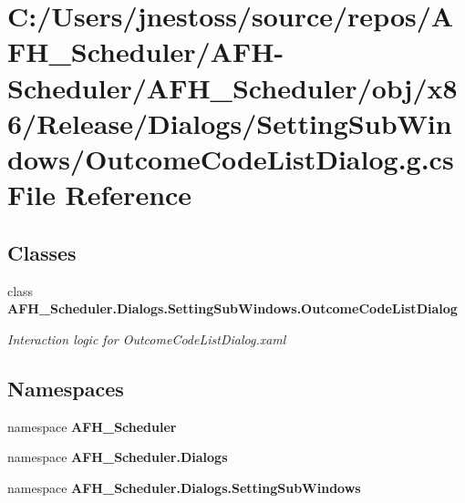 \section{C\+:/\+Users/jnestoss/source/repos/\+A\+F\+H\+\_\+\+Scheduler/\+A\+F\+H-\/\+Scheduler/\+A\+F\+H\+\_\+\+Scheduler/obj/x86/\+Release/\+Dialogs/\+Setting\+Sub\+Windows/\+Outcome\+Code\+List\+Dialog.g.\+cs File Reference}
\label{x86_2_release_2_dialogs_2_setting_sub_windows_2_outcome_code_list_dialog_8g_8cs}
\subsection*{Classes}
\begin{DoxyCompactItemize}
\item 
class \textbf{ A\+F\+H\+\_\+\+Scheduler.\+Dialogs.\+Setting\+Sub\+Windows.\+Outcome\+Code\+List\+Dialog}
\begin{DoxyCompactList}\small\item\em Interaction logic for Outcome\+Code\+List\+Dialog.\+xaml \end{DoxyCompactList}\end{DoxyCompactItemize}
\subsection*{Namespaces}
\begin{DoxyCompactItemize}
\item 
namespace \textbf{ A\+F\+H\+\_\+\+Scheduler}
\item 
namespace \textbf{ A\+F\+H\+\_\+\+Scheduler.\+Dialogs}
\item 
namespace \textbf{ A\+F\+H\+\_\+\+Scheduler.\+Dialogs.\+Setting\+Sub\+Windows}
\end{DoxyCompactItemize}
